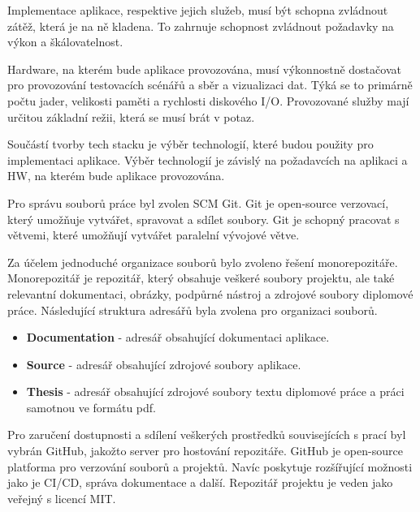 

Implementace aplikace, respektive jejich služeb, musí být schopna zvládnout zátěž, která je na ně kladena. To zahrnuje schopnost zvládnout požadavky na výkon a škálovatelnost.


Hardware, na kterém bude aplikace provozována, musí výkonnostně dostačovat pro provozování testovacích scénářů a sběr a vizualizaci dat. Týká se to primárně počtu jader, velikosti paměti a rychlosti diskového I/O. Provozované služby mají určitou základní režii, která se musí brát v potaz.


Součástí tvorby tech stacku je výběr technologií, které budou použity pro implementaci aplikace. Výběr technologií je závislý na požadavcích na aplikaci a HW, na kterém bude aplikace provozována.


Pro správu souborů práce byl zvolen SCM Git. Git je open-source verzovací, který umožňuje vytvářet, spravovat a sdílet soubory. Git je schopný pracovat s větvemi, které umožňují vytvářet paralelní vývojové větve.

Za účelem jednoduché organizace souborů bylo zvoleno řešení monorepozitáře. Monorepozitář je repozitář, který obsahuje veškeré soubory projektu, ale také relevantní dokumentaci, obrázky, podpůrné nástroj a zdrojové soubory diplomové práce. Následující struktura adresářů byla zvolena pro organizaci souborů.

\begin{itemize}
    \item \textbf{Documentation} - adresář obsahující dokumentaci aplikace.
    \item \textbf{Source} - adresář obsahující zdrojové soubory aplikace.
    \item \textbf{Thesis} - adresář obsahující zdrojové soubory textu diplomové práce a práci samotnou ve formátu pdf.
\end{itemize}

Pro zaručení dostupnosti a sdílení veškerých prostředků souvisejících s prací byl vybrán GitHub, jakožto server pro hostování repozitáře. GitHub je open-source platforma pro verzování souborů a projektů. Navíc poskytuje rozšířující možnosti jako je CI/CD, správa dokumentace a další. Repozitář projektu je veden jako veřejný s licencí MIT.

